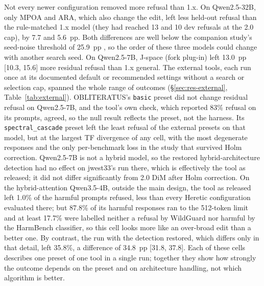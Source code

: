 Not every newer configuration removed more refusal than 1.x. On Qwen2.5-32B, only MPOA and ARA, which also change
the edit, left less held-out refusal than the rule-matched 1.x model (they had reached 13 and 10 dev refusals at the
2.0 cap), by 7.7 and 5.6~pp. Both differences are well below the companion study's seed-noise threshold of
25.9~pp \cite{young2026harder}, so the order of these three models could change with another search seed. On
Qwen2.5-7B, J-space (fork plug-in) left 13.0~pp [10.3, 15.6] more residual refusal than 1.x general. The external
tools, each run once at its documented default or recommended settings without a search or selection cap, spanned
the whole range of outcomes (\S\ref{sec:res-external}, Table~\ref{tab:external}). OBLITERATUS's \texttt{basic}
preset did not change residual refusal on Qwen2.5-7B, and the tool's own check, which reported 83\% refusal on its
prompts, agreed, so the null result reflects the preset, not the harness. Its \texttt{spectral\_cascade} preset left
the least refusal of the external presets on that model, but at the largest TF divergence of any cell, with the most
degenerate responses and the only per-benchmark loss in the study that survived Holm correction. Qwen2.5-7B is not a
hybrid model, so the restored hybrid-architecture detection had no effect on jwest33's run there, which is
effectively the tool as released; it did not differ significantly from 2.0 DiM after Holm correction. On the
hybrid-attention Qwen3.5-4B, outside the main design, the tool as released left 1.0\% of the harmful prompts refused,
less than every Heretic configuration evaluated there; but 87.8\% of its harmful responses ran to the 512-token limit
and at least 17.7\% were labelled neither a refusal by WildGuard nor harmful by the HarmBench classifier, so this cell
looks more like an over-broad edit than a better one.
By contrast, the run with the detection restored, which differs only in that
detail, left 35.8\%, a difference of 34.8~pp [31.8, 37.8]. Each
of these cells describes one preset of one tool in a single run; together they show how strongly the outcome depends on the preset and on
architecture handling, not which algorithm is better.
